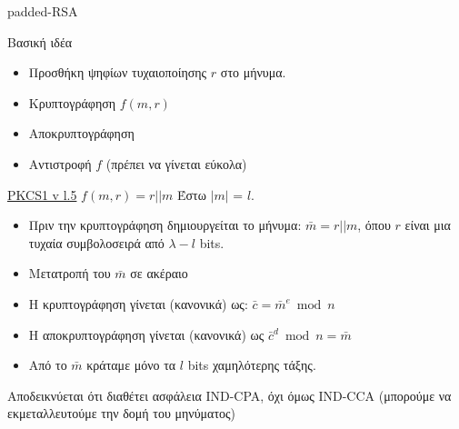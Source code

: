 \documentclass[handout]{beamer}
\begin{document}
\begin{frame}[allowframebreaks]{padded-RSA}

\begin{block}{Βασική ιδέα}
\begin{itemize}
    \item Προσθήκη ψηφίων τυχαιοποίησης $r$ στο μήνυμα. 
    \item Κρυπτογράφηση $f(m,r)$
    \item Αποκρυπτογράφηση
    \item Αντιστροφή $f$ (πρέπει να γίνεται εύκολα)
\end{itemize}
\end{block}

\begin{block}{\href{https://tools.ietf.org/html/rfc2313}{PKCS1 v l.5} $f(m,r) = r||m$}
 Έστω $|m|$ = $l$.
\begin{itemize}
\item Πριν την κρυπτογράφηση δημιουργείται το μήνυμα: $\bar{m} = r || m$, όπου $r$ είναι μια τυχαία συμβολοσειρά από $\lambda-l$ bits.
\item Μετατροπή του $\bar{m}$ σε ακέραιο
\item Η κρυπτογράφηση γίνεται (κανονικά) ως: $\bar{c} = \bar{m}^e \bmod n$
\item H αποκρυπτογράφηση γίνεται (κανονικά) ως $\bar{c}^d \bmod n = \bar{m} $
\item Από το $\bar{m}$ κράταμε μόνο τα $l$ bits χαμηλότερης τάξης.
\end{itemize}
\end{block}

Αποδεικνύεται ότι διαθέτει ασφάλεια IND-CPA, όχι όμως IND-CCA (μπορούμε να εκμεταλλευτούμε την δομή του μηνύματος)
\end{frame}
\end{document}
